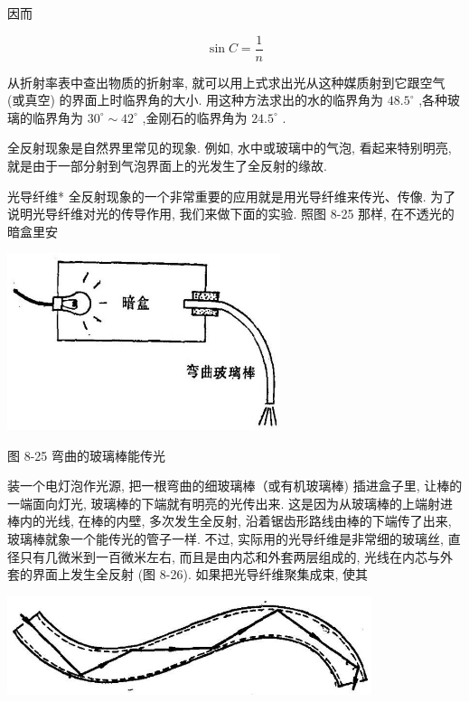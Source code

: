 \documentclass[10pt]{article}
\begin{document}
因而

\[
\sin C = \frac{1}{n}
\]

从折射率表中查出物质的折射率, 就可以用上式求出光从这种媒质射到它跟空气 (或真空) 的界面上时临界角的大小. 用这种方法求出的水的临界角为 \({48.5}^{ \circ }\) ,各种玻璃的临界角为 \({30}^{ \circ } \sim {42}^{ \circ }\) ,金刚石的临界角为 \({24.5}^{ \circ }\) .

全反射现象是自然界里常见的现象. 例如, 水中或玻璃中的气泡, 看起来特别明亮, 就是由于一部分射到气泡界面上的光发生了全反射的缘故.

光导纤维* 全反射现象的一个非常重要的应用就是用光导纤维来传光、传像. 为了说明光导纤维对光的传导作用, 我们来做下面的实验. 照图 8-25 那样, 在不透光的暗盒里安

\begin{center}
\includegraphics[max width=0.6\textwidth]{images/01913056-1f15-74d8-9184-9aab52c9d66b_266_149103.jpg}
\end{center}

图 8-25 弯曲的玻璃棒能传光

装一个电灯泡作光源, 把一根弯曲的细玻璃棒（或有机玻璃棒) 插进盒子里, 让棒的一端面向灯光, 玻璃棒的下端就有明亮的光传出来. 这是因为从玻璃棒的上端射进棒内的光线, 在棒的内壁, 多次发生全反射, 沿着锯齿形路线由棒的下端传了出来, 玻璃棒就象一个能传光的管子一样. 不过, 实际用的光导纤维是非常细的玻璃丝, 直径只有几微米到一百微米左右, 而且是由内芯和外套两层组成的, 光线在内芯与外套的界面上发生全反射 (图 8-26). 如果把光导纤维聚集成束, 使其

\begin{center}
\includegraphics[max width=0.8\textwidth]{images/01913056-1f15-74d8-9184-9aab52c9d66b_266_229733.jpg}
\end{center}
\end{document}
